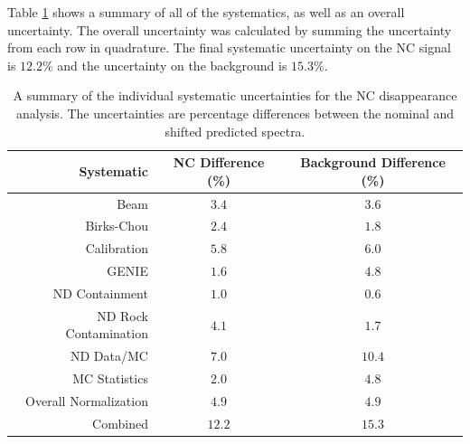 Table \ref{tab:SystSummary} shows a summary of all of the systematics, as well as an overall uncertainty. The overall uncertainty was calculated by summing the uncertainty from each row in quadrature. The final systematic uncertainty on the NC signal is $12.2\%$ and the uncertainty on the background is $15.3\%$.
\begin{table}[htb]
  \begin{center}
    \begin{tabular}{r c c}
      \hline\hline
      Systematic & NC Difference (\%) & Background Difference (\%) \\
      \hline
      Beam & $3.4$ & $3.6$ \\
      Birks-Chou & $2.4$ & $1.8$ \\
      Calibration & $5.8$ & $6.0$ \\
      GENIE & $1.6$ & $4.8$ \\
      ND Containment & $1.0$ & $0.6$ \\
      ND Rock Contamination & $4.1$ & $1.7$ \\
      ND Data/MC & $7.0$ & $10.4$ \\
      MC Statistics & $2.0$ & $4.8$ \\
      Overall Normalization & $4.9$ & $4.9$ \\
      \hline
      Combined & $12.2$ & $15.3$ \\
      \hline
    \end{tabular}
    \caption[Systematic Uncertainty Summary]{A summary of the individual systematic uncertainties for the NC disappearance analysis. The uncertainties are percentage differences between the nominal and shifted predicted spectra.}
    \label{tab:SystSummary}
  \end{center}
\end{table}

